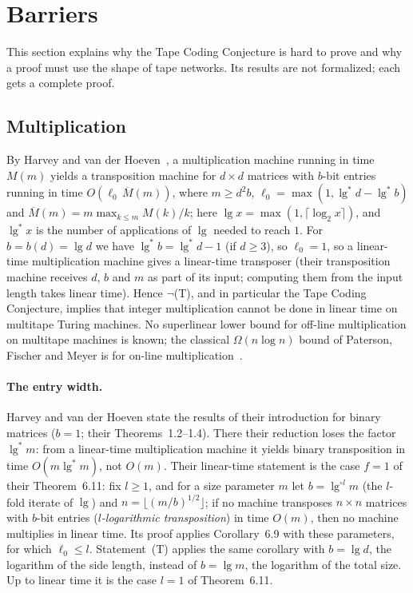 \section{Barriers}\label{sec:barriers}

This section explains why the Tape Coding Conjecture is hard to prove and why a proof must use the
shape of tape networks. Its results are not formalized; each gets a complete proof.

\subsection{Multiplication}\label{sec:multiplication}

By Harvey and van der Hoeven~\cite[Cor.~6.9]{HvdH2025}, a multiplication machine running in time
$M(m)$ yields a transposition machine for $d\times d$ matrices with $b$-bit entries running in time
$O(\ell_0\,\overline M(m))$, where $m\ge d^2b$, $\ell_0=\max(1,\lg^*d-\lg^*b)$ and
$\overline M(m)=m\max_{k\le m}M(k)/k$; here $\lg x=\max(1,\lceil\log_2x\rceil)$, and $\lg^*x$ is the number of applications of $\lg$ needed to reach $1$. For $b=b(d)=\lg d$ we have $\lg^*b=\lg^*d-1$ (if $d\ge3$), so $\ell_0=1$, so a linear-time multiplication machine gives a linear-time transposer (their transposition machine receives $d$, $b$ and $m$ as part of its input; computing them from the input length takes linear time). Hence $\neg$(T), and in particular
the Tape Coding Conjecture, implies that integer multiplication cannot be done in linear time on
multitape Turing machines. No superlinear lower bound for off-line multiplication on multitape
machines is known; the classical $\Omega(n\log n)$ bound of Paterson, Fischer and Meyer is for
on-line multiplication~\cite{PFM1974}.

\paragraph{The entry width.} Harvey and van der Hoeven state the results of their introduction for binary matrices ($b=1$; their Theorems~1.2--1.4). There their reduction loses the factor $\lg^*m$: from a linear-time multiplication machine it yields binary transposition in time $O(m\lg^*m)$, not $O(m)$. Their linear-time statement is the case $f=1$ of their Theorem~6.11: fix
$l\ge1$, and for a size parameter $m$ let $b=\lg^{\circ l}m$ (the $l$-fold iterate of $\lg$) and
$n=\lfloor(m/b)^{1/2}\rfloor$; if no machine transposes $n\times n$ matrices with $b$-bit entries
(\emph{$l$-logarithmic transposition}) in time $O(m)$, then no machine multiplies in linear time. Its proof
applies Corollary~6.9 with these parameters, for which $\ell_0\le l$. Statement~(T) applies the same corollary
with $b=\lg d$, the logarithm of the side length, instead of $b=\lg m$, the logarithm of the total size. Up to
linear time it is the case $l=1$ of Theorem~6.11.

